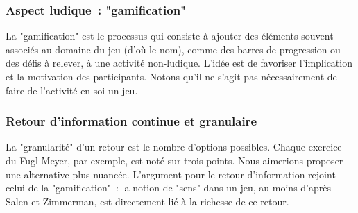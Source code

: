     \subsubsection{Aspect ludique~: "gamification"}
    La "gamification" est le processus qui consiste à ajouter des éléments 
    souvent associés au domaine du jeu (d'où le nom), comme des barres de
    progression ou des défis à relever, à une activité non-ludique. L'idée est 
    de favoriser l'implication et la motivation des participants. 
    Notons qu'il ne s'agit pas nécessairement de faire de l'activité en soi un 
    jeu.
    \subsubsection{Retour d'information continue et granulaire}
    La "granularité" d'un retour est le nombre d'options possibles. 
    Chaque exercice du Fugl-Meyer, par exemple, est noté sur trois points. Nous 
    aimerions proposer une alternative plus nuancée.
    L'argument pour le retour d'information rejoint celui de la "gamification"~:
    la notion de "sens" dans un jeu, au moins d'après Salen et Zimmerman, est 
    directement lié à la richesse de ce retour.
